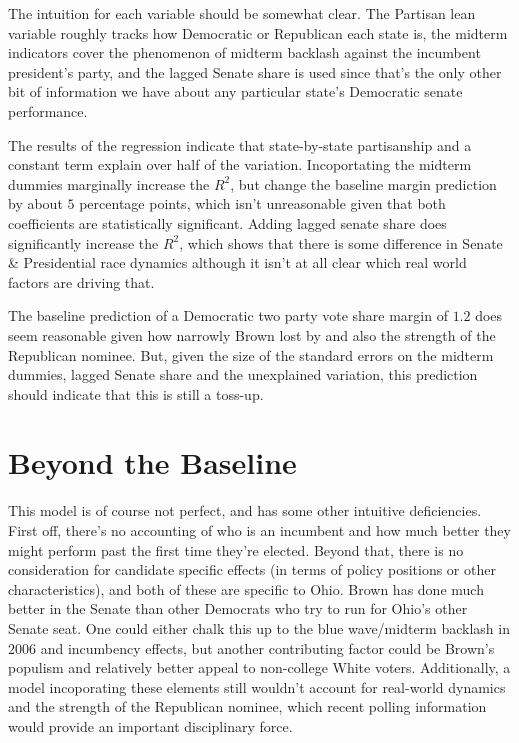 \documentclass{article}
\theoremstyle{definition}
\begin{document}
The intuition for each variable should be somewhat clear. The Partisan lean variable roughly tracks how Democratic or Republican each state is, the midterm indicators cover the phenomenon of midterm backlash against the incumbent president's party, and the lagged Senate share is used since that's the only other bit of information we have about any particular state's Democratic senate performance. 

The results of the regression indicate that state-by-state partisanship and a constant term explain over half of the variation. Incoportating the midterm dummies marginally increase the $R^2$, but change the baseline margin prediction by about $5$ percentage points, which isn't unreasonable given that both coefficients are statistically significant. Adding lagged senate share does significantly increase the $R^2$, which shows that there is some difference in Senate \& Presidential race dynamics although it isn't at all clear which real world factors are driving that. 

The baseline prediction of a Democratic two party vote share margin of $1.2$ does seem reasonable given how narrowly Brown lost by and also the strength of the Republican nominee. But, given the size of the standard errors on the midterm dummies, lagged Senate share and the unexplained variation, this prediction should indicate that this is still a toss-up.  


\section*{Beyond the Baseline}
This model is of course not perfect, and has some other intuitive deficiencies. First off, there's no accounting of who is an incumbent and how much better they might perform past the first time they're elected. Beyond that, there is no consideration for candidate specific effects (in terms of policy positions or other characteristics), and both of these are specific to Ohio. Brown has done much better in the Senate than other Democrats who try to run for Ohio's other Senate seat. One could either chalk this up to the blue wave/midterm backlash in $2006$ and incumbency effects, but another contributing factor could be Brown's populism and relatively better appeal to non-college White voters. Additionally, a model incoporating these elements still wouldn't account for real-world dynamics and the strength of the Republican nominee, which recent polling information would provide an important disciplinary force.
\end{document}

